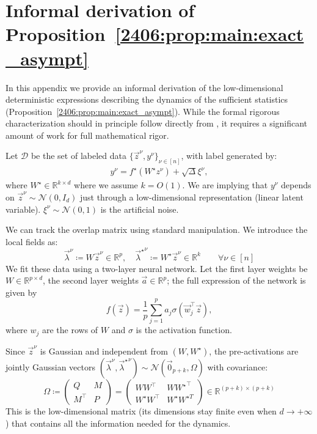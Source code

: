 \section{Informal derivation of Proposition~\ref{2406:prop:main:exact_asympt}} \label{2406:sec:app:derivation_of_lb_equations}
In this appendix we provide an informal derivation of the low-dimensional deterministic expressions describing the dynamics of the sufficient statistics (Proposition~\ref{2406:prop:main:exact_asympt}).  While the formal rigorous characterization should in principle follow directly from \cite{veiga2022phase}, it requires a significant amount of work for full mathematical rigor.

 Let $\mathcal{D}$ be the set of labeled data $\{\vec{z}^{\nu}, y^{\nu}\}_{\nu \in [n]}$, with label generated by:
\begin{align*}
    y^\nu = f^\star(W^\star z^\nu) + \sqrt{\Delta} \xi^\nu,
\end{align*}
where \(W^\star \in \mathbb R^{k\times d} \) where we assume \(k =O(1)\). We are implying that \(y^{\nu}\) depends on \(\vec z^\nu \sim \mathcal{N}(0,I_d)\) just through a low-dimensional representation (linear latent variable). \(\xi^\nu\sim \mathcal{N}{(0,1)}\) is the artificial noise.

We can track the overlap matrix using standard manipulation. 
We introduce the local fields as:
\begin{equation*}
    \vec{\lambda}^{\nu}\coloneqq W\vec{z}^{\nu}\in\mathbb{R}^{p}, \quad {\vec{\lambda}^{\star}}^{\nu}\coloneqq W^{\star}\vec{z}^{\nu}\in\mathbb{R}^{k} \qquad \forall \nu \in [n]
\end{equation*}
We fit these data using a two-layer neural network. Let the first layer weights be $W \in \mathbb{R}^{p \times d}$, the second layer weights \(\vec a\in\mathbb{R}^p\); the full expression of the network is given by
\[
    f(\vec z) = \frac{1}{p} \sum_{j=1}^p a_j \sigma{(\vec w_j^\top \vec z)},
\]
where \(w_j\) are the rows of \(W\) and \(\sigma\) is the activation function.

Since $\vec{z}^\nu$ is Gaussian and independent from $(W, W^{\star})$, the pre-activations are jointly Gaussian vectors $(\vec{\lambda}^{\nu}, {\vec{\lambda}^{\star}}^{\nu})\sim\mathcal{N}(\vec{0}_{p+k}, \Omega)$ with covariance: 
\begin{equation*}
\Omega \coloneqq
\begin{pmatrix}
Q & M\\
{M^{\top}} & P
\end{pmatrix}=
\begin{pmatrix}
W{W}^{\top} & W{W^{\star}}^{\top}\\
W^{\star}W^{\top} & W^{\star} W^{\star T}
\end{pmatrix}
\in\mathbb{R}^{(p+k)\times (p+k)}
\end{equation*}
This is the low-dimensional matrix (its dimensions stay finite even when \(d\to+\infty\)) that contains all the information needed for the dynamics.

